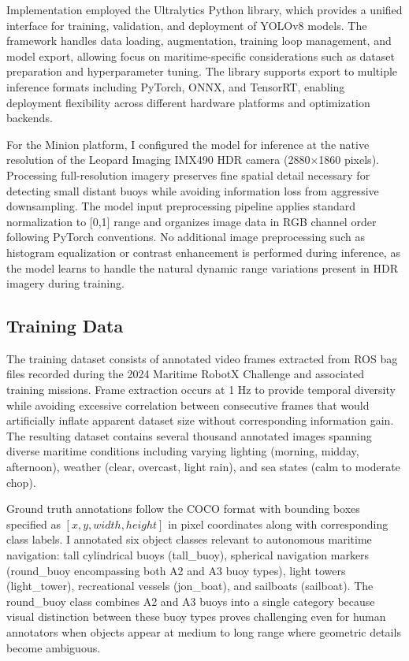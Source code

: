 Implementation employed the Ultralytics Python library, which provides a unified interface for training, validation, and deployment of YOLOv8 models.
The framework handles data loading, augmentation, training loop management, and model export, allowing focus on maritime-specific considerations such as dataset preparation and hyperparameter tuning.
The library supports export to multiple inference formats including PyTorch, ONNX, and TensorRT, enabling deployment flexibility across different hardware platforms and optimization backends.

For the Minion platform, I configured the model for inference at the native resolution of the Leopard Imaging IMX490 \ac{HDR} camera (2880×1860 pixels).
Processing full-resolution imagery preserves fine spatial detail necessary for detecting small distant buoys while avoiding information loss from aggressive downsampling.
The model input preprocessing pipeline applies standard normalization to [0,1] range and organizes image data in RGB channel order following PyTorch conventions.
No additional image preprocessing such as histogram equalization or contrast enhancement is performed during inference, as the model learns to handle the natural dynamic range variations present in \ac{HDR} imagery during training.

\subsection{Training Data} \label{sec:yolo_training data}

The training dataset consists of annotated video frames extracted from ROS bag files recorded during the 2024 Maritime RobotX Challenge and associated training missions.
Frame extraction occurs at 1 Hz to provide temporal diversity while avoiding excessive correlation between consecutive frames that would artificially inflate apparent dataset size without corresponding information gain.
The resulting dataset contains several thousand annotated images spanning diverse maritime conditions including varying lighting (morning, midday, afternoon), weather (clear, overcast, light rain), and sea states (calm to moderate chop).

Ground truth annotations follow the COCO format with bounding boxes specified as $[x, y, width, height]$ in pixel coordinates along with corresponding class labels.
I annotated six object classes relevant to autonomous maritime navigation: tall cylindrical buoys (tall\_buoy), spherical navigation markers (round\_buoy encompassing both A2 and A3 buoy types), light towers (light\_tower), recreational vessels (jon\_boat), and sailboats (sailboat).
The round\_buoy class combines A2 and A3 buoys into a single category because visual distinction between these buoy types proves challenging even for human annotators when objects appear at medium to long range where geometric details become ambiguous.

